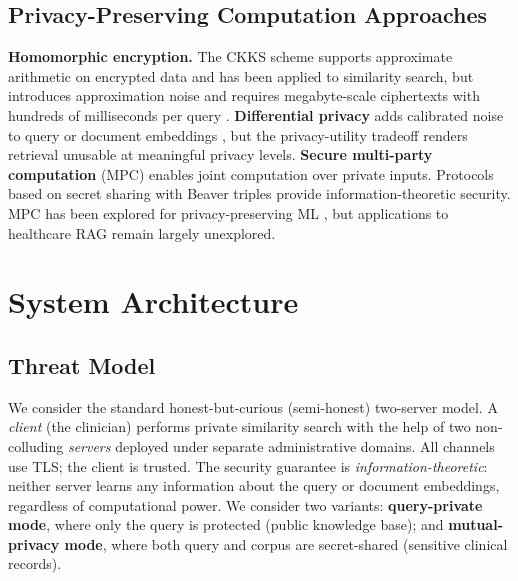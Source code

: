 \documentclass[conference]{IEEEtran}
\begin{document}
\subsection{Privacy-Preserving Computation Approaches}
\label{sec:bg_ppml}

\textbf{Homomorphic encryption.}
The CKKS scheme \cite{cheon2017ckks} supports approximate arithmetic on
encrypted data and has been applied to similarity search,
but introduces approximation noise and
requires megabyte-scale ciphertexts with hundreds of milliseconds per query
\cite{zuber2021knn}.
\textbf{Differential privacy} \cite{dwork2006dp} adds calibrated noise to
query or document embeddings
\cite{lyu2020dp}, but the privacy-utility tradeoff renders
retrieval unusable at meaningful privacy levels.
\textbf{Secure multi-party computation} (MPC)
\cite{yao1986garbled, goldreich1987mpc} enables joint computation
over private inputs. Protocols based on secret sharing
\cite{shamir1979sharing, ben-or1988completeness} with Beaver triples
\cite{beaver1991triples} provide information-theoretic security.
MPC has been explored for privacy-preserving ML
\cite{mohassel2017secureml}, but applications to healthcare RAG remain
largely unexplored.


\section{System Architecture}
\label{sec:architecture}

\subsection{Threat Model}
\label{sec:threat_model}

We consider the standard honest-but-curious (semi-honest) two-server model.
A \emph{client} (the clinician) performs private similarity search with the
help of two non-colluding \emph{servers} deployed under separate
administrative domains. All channels use TLS; the client is trusted.
The security guarantee is \emph{information-theoretic}: neither server
learns any information about the query or document embeddings, regardless
of computational power. We consider two variants:
\textbf{query-private mode}, where only the query is protected (public
knowledge base); and \textbf{mutual-privacy mode}, where both query and
corpus are secret-shared (sensitive clinical records).
\end{document}
